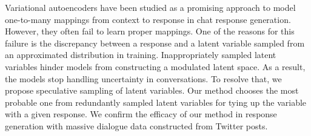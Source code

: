 Variational autoencoders have been studied as a promising approach to model one-to-many mappings from context to response in chat response generation. However, they often fail to learn proper mappings.  One of the reasons for this failure is the discrepancy between a response and a latent variable sampled from an approximated distribution in training. Inappropriately sampled latent variables hinder models from constructing a modulated latent space.  As a result, the models stop handling uncertainty in conversations. To resolve that, we propose speculative sampling of latent variables. Our method chooses the most probable one from redundantly sampled latent variables for tying up the variable with a given response. We confirm the efficacy of our method in response generation with massive dialogue data constructed from Twitter posts.
